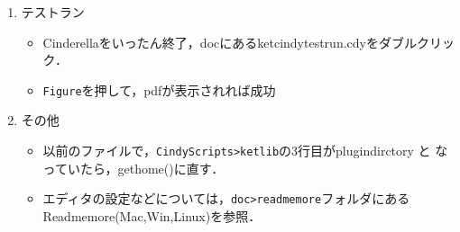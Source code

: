 \documentclass{ujarticle}
\begin{document}
\begin{enumerate}[\bf\large 1.]
\vspace{71mm}

\item テストラン\vspace{-2mm}

\begin{itemize}
 \item Cinderellaをいったん終了，docにあるketcindytestrun.cdyをダブルクリック．
\item\verb|Figure|を押して，pdfが表示されれば成功
\end{itemize}

\item  その他
\begin{itemize}
\item 以前のファイルで，\verb|CindyScripts>ketlib|の3行目がplugindirctory と
なっていたら，gethome()に直す．
\item エディタの設定などについては，\verb|doc>readmemore|フォルダにあるReadmemore(Mac,Win,Linux)を参照．
\end{itemize}
\end{enumerate}
\end{document}
